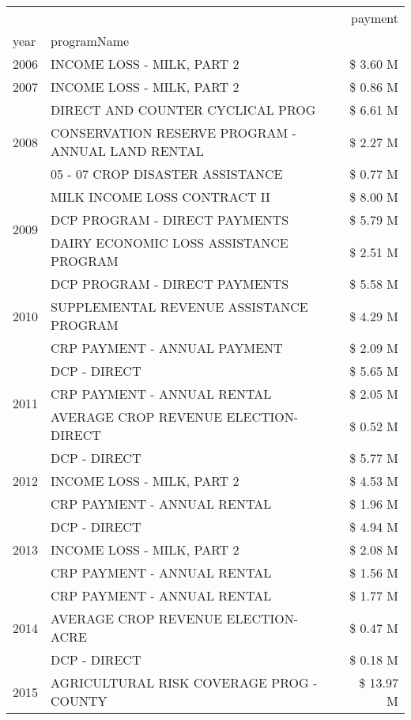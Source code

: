 \begin{tabular}{llr}
\toprule
 &  & payment \\
year & programName &  \\
\midrule
2006 & INCOME LOSS - MILK, PART 2 & \$ 3.60 M \\
\cline{1-3}
2007 & INCOME LOSS - MILK, PART 2 & \$ 0.86 M \\
\cline{1-3}
\multirow[t]{3}{*}{2008} & DIRECT AND COUNTER CYCLICAL PROG & \$ 6.61 M \\
 & CONSERVATION RESERVE PROGRAM - ANNUAL LAND RENTAL & \$ 2.27 M \\
 & 05 - 07 CROP DISASTER ASSISTANCE & \$ 0.77 M \\
\cline{1-3}
\multirow[t]{3}{*}{2009} & MILK INCOME LOSS CONTRACT II & \$ 8.00 M \\
 & DCP PROGRAM - DIRECT PAYMENTS & \$ 5.79 M \\
 & DAIRY ECONOMIC LOSS ASSISTANCE PROGRAM & \$ 2.51 M \\
\cline{1-3}
\multirow[t]{3}{*}{2010} & DCP PROGRAM - DIRECT PAYMENTS & \$ 5.58 M \\
 & SUPPLEMENTAL REVENUE ASSISTANCE PROGRAM & \$ 4.29 M \\
 & CRP PAYMENT - ANNUAL PAYMENT & \$ 2.09 M \\
\cline{1-3}
\multirow[t]{3}{*}{2011} & DCP - DIRECT & \$ 5.65 M \\
 & CRP PAYMENT - ANNUAL RENTAL & \$ 2.05 M \\
 & AVERAGE CROP REVENUE ELECTION-DIRECT & \$ 0.52 M \\
\cline{1-3}
\multirow[t]{3}{*}{2012} & DCP - DIRECT & \$ 5.77 M \\
 & INCOME LOSS - MILK, PART 2 & \$ 4.53 M \\
 & CRP PAYMENT - ANNUAL RENTAL & \$ 1.96 M \\
\cline{1-3}
\multirow[t]{3}{*}{2013} & DCP - DIRECT & \$ 4.94 M \\
 & INCOME LOSS - MILK, PART 2 & \$ 2.08 M \\
 & CRP PAYMENT - ANNUAL RENTAL & \$ 1.56 M \\
\cline{1-3}
\multirow[t]{3}{*}{2014} & CRP PAYMENT - ANNUAL RENTAL & \$ 1.77 M \\
 & AVERAGE CROP REVENUE ELECTION-ACRE & \$ 0.47 M \\
 & DCP - DIRECT & \$ 0.18 M \\
\cline{1-3}
\multirow[t]{3}{*}{2015} & AGRICULTURAL RISK COVERAGE PROG - COUNTY & \$ 13.97 M \\

\end{tabular}
